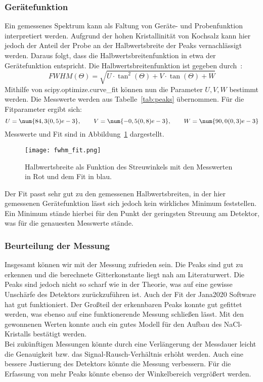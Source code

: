 \subsubsection{Gerätefunktion}
\label{sec:geraetefunktion}

Ein gemessenes Spektrum kann als Faltung von Geräte- und Probenfunktion interpretiert werden. 
Aufgrund der hohen Kristallinität von Kochsalz kann hier jedoch der Anteil der Probe an der Halbwertsbreite der Peaks vernachlässigt werden. Daraus folgt, dass die Halbwertsbreitenfunktion in etwa der Gerätefunktion entspricht. Die Halbwertsbreitenfunktion ist gegeben durch~\cite[]{Anleitung}:
\begin{equation}
    FWHM(\Theta) = \sqrt{U \cdot \tan^2(\Theta) + V \cdot \tan(\Theta) + W}
\end{equation}
Mithilfe von scipy.optimize.curve\_fit können nun die Parameter $U, V, W$ bestimmt werden. Die Messwerte werden aus Tabelle~\ref{tab:peaks} übernommen. Für die Fitparameter ergibt sich:
\begin{equation*}
    U = \num{84,3(0,5)e-3}, \qquad V = \num{-0,5(0,8)e-3}, \qquad W = \num{90,0(0,3)e-3}
\end{equation*}
Messwerte und Fit sind in Abbildung~\ref{fig:geraetefunktion} dargestellt.

\begin{figure}[hbt!]
    \centering
    \texttt{[image: fwhm\_fit.png]}
    \caption{Halbwertsbreite als Funktion des Streuwinkels mit den Messwerten in Rot und dem Fit in blau.}
    \label{fig:geraetefunktion}
\end{figure}

Der Fit passt sehr gut zu den gemessenen Halbwertsbreiten, in der hier gemessenen Gerätefunktion lässt sich jedoch kein wirkliches Minimum feststellen. Ein Minimum stände hierbei für den Punkt der geringsten Streuung am Detektor, was für die genauesten Messwerte stände.


\subsubsection{Beurteilung der Messung}
Insgesamt können wir mit der Messung zufrieden sein. Die Peaks sind gut zu erkennen und die berechnete Gitterkonstante liegt nah am Literaturwert. Die Peaks sind jedoch nicht so scharf wie in der Theorie, was auf eine gewisse Unschärfe des Detektors zurückzuführen ist. Auch der Fit der Jana2020 Software hat gut funktioniert. Der Großteil der erkennbaren Peaks konnte gut gefittet werden, was ebenso auf eine funktionerende Messung schließen lässt. Mit den gewonnenen Werten konnte auch ein gutes Modell für den Aufbau des NaCl-Kristalls bestätigt werden.\\
Bei zukünftigen Messungen könnte durch eine Verlängerung der Messdauer leicht die Genauigkeit bzw. das Signal-Rausch-Verhältnis erhöht werden. Auch eine bessere Justierung des Detektors könnte die Messung verbessern. Für die Erfassung von mehr Peaks könnte ebenso der Winkelbereich vergrößert werden.
\clearpage
